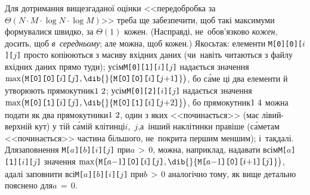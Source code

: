 Для дотримання вищезгаданої оцінки <<передобробка за ${\Theta(N{\cdot}M{\cdot}\log{N}{\cdot}\log{M})}$>> треба ще забезпечити, щоб такі максимуми формувалися швидко, за $\Theta(1)$ кожен. 
(Насправді, не~обо\-в'\-яз\-ко\-во \emph{кожен}, досить, щоб \emph{в~середньому}; але можна, щоб кожен.) Якось\nolinebreak[2] так: елементи \texttt{M[0][0][$i$][$j$]} просто копіюються з масиву вхідних даних (чи~навіть читаються з файлу вхідних даних прямо туди); усім\nolinebreak[2] \texttt{M[0][1][$i$][$j$]} надається значення $\max\bigl({\texttt{M[0][0][}i\texttt{][}j\texttt{]}},\dib{{}}{\texttt{M[0][0][}i\texttt{][}j{+}1\texttt{]}}\bigr)$, бо с\'{а}ме ці два елементи й утворюють прямокутник\nolinebreak[2] ${1\,{\*}\,2}$; усім\nolinebreak[2] \texttt{M[0][2][$i$][$j$]} надається значення $\max\bigl({\texttt{M[0][1][}i\texttt{][}j\texttt{]}},\dib{{}}{\texttt{M[0][1][}i\texttt{][}j{+}2\texttt{]}}\bigr)$, бо прямокутник\nolinebreak[2] ${1\,{\*}\,4}$ можна подати як два прямокутники\nolinebreak[2] ${1\,{\*}\,2}$, один з яких <<починається>> (має лівий-верхній кут) у тій с\'{а}мій клітинці\nolinebreak[3] $i$,~$j$,\linebreak[2] а~інший на\nolinebreak[3] клітинки правіше (с\'{а}ме\nolinebreak[3] там <<починається>> частина більшого, не~покрита першим меншим); і~так\nolinebreak[3] \mbox{далі}. Для\nolinebreak[2] заповнення \texttt{M[$a$][$b$][$i$][$j$]} при\nolinebreak[3] ${a\,{>}\,0}$, можна, наприклад, надавати всім\nolinebreak[2] \texttt{M[$a$][1][$i$][$j$]} значення $\max\bigl({\texttt{M[}a{-}1\texttt{][0][}i\texttt{][}j\texttt{]}},\dib{{}}{\texttt{M[}a{-}1\texttt{][0][}i{+}1\texttt{][}j\texttt{]}}\bigr)$, а\nolinebreak[3] далі заповнити всі\nolinebreak[2] \texttt{M[$a$][$b$][$i$][$j$]} при\nolinebreak[3] ${b\,{>}\,0}$ аналогічно тому, як вище детально пояснено для\nolinebreak[3] ${a\,{=}\,0}$.

